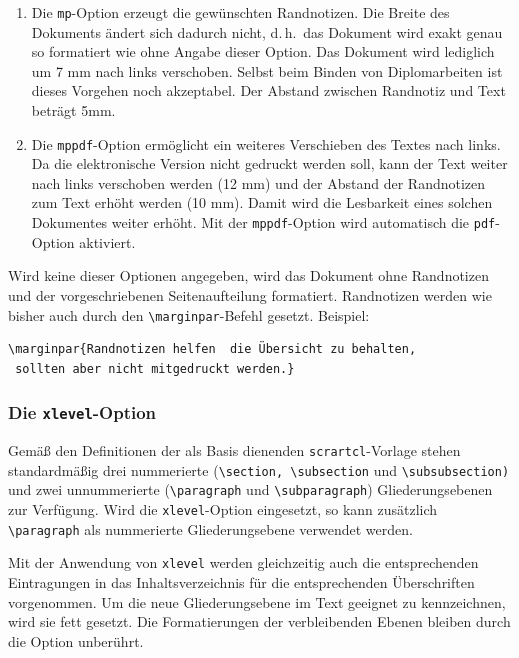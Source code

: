 \documentclass[english, trackchanges, hyperref, ngerman ,pdf, mp, mppdf]{wise}
\newcommand\code[1]{\texttt{#1}}
\newcommand\command[1]{\code{\textbackslash{}#1}}
\begin{document}
\begin{enumerate}
\item Die \code{mp}-Option erzeugt die gewünschten Randnotizen. Die Breite
des Dokuments ändert sich dadurch nicht, d.\,h.\ das Dokument
wird exakt genau so formatiert wie ohne Angabe dieser Option. Das
Dokument wird lediglich um 7 mm nach links verschoben. Selbst beim
Binden von Diplomarbeiten ist dieses Vorgehen noch akzeptabel. Der
Abstand zwischen Randnotiz und Text beträgt 5mm.
\item Die \code{mppdf}-Option ermöglicht ein weiteres Verschieben des
Textes nach links. Da die elektronische Version nicht gedruckt werden
soll, kann der Text weiter nach links verschoben werden (12 mm) und
der Abstand der Randnotizen zum Text erhöht werden (10 mm). Damit wird
die Lesbarkeit eines solchen Dokumentes weiter erhöht. Mit der \code{mppdf}-Option
wird automatisch die \code{pdf}-Option aktiviert.
\end{enumerate}
Wird keine dieser Optionen angegeben, wird das Dokument ohne Randnotizen
und der vorgeschriebenen Seitenaufteilung formatiert. Randnotizen
werden wie bisher auch durch den \command{marginpar}-Befehl
gesetzt. Beispiel:
\begin{footnotesize}
\begin{lstlisting}
\marginpar{Randnotizen helfen  die Übersicht zu behalten,
 sollten aber nicht mitgedruckt werden.} 
\end{lstlisting}
\end{footnotesize}




\subsubsection{Die \code{xlevel}-Option}

Gemäß den Definitionen der als Basis dienenden \code{scrartcl}-Vorlage
stehen standardmäßig drei nummerierte (\command{section,
\textbackslash{}subsection} und \command{subsubsection)}
und zwei unnummerierte (\command{paragraph} und \command{subparagraph})
Gliederungsebenen zur Verfügung. Wird die \code{xlevel}-Option eingesetzt,
so kann zusätzlich \command{paragraph} als nummerierte
Gliederungsebene verwendet werden.

Mit der Anwendung von \code{xlevel} werden gleichzeitig auch die
entsprechenden Eintragungen in das Inhaltsverzeichnis für die entsprechenden
Überschriften vorgenommen. Um die neue Gliederungsebene im Text geeignet
zu kennzeichnen, wird sie fett \code{\textit{}}gesetzt. Die Formatierungen
der verbleibenden Ebenen bleiben durch die Option unberührt.
\end{document}
